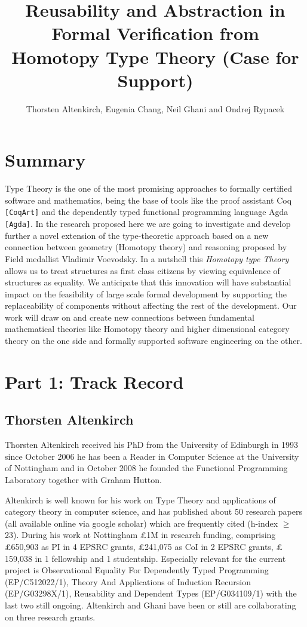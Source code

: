 \documentclass[twocolumn,a4paper,11pt]{article}
\title{Reusability and Abstraction in Formal Verification from Homotopy Type Theory
\LARGE (Case for Support)}
\author{Thorsten Altenkirch, Eugenia Chang, Neil Ghani and Ondrej Rypacek}
\date{}
\renewcommand{\cite}[1]{{\tt[#1]}}
\begin{document}
\raggedright
\sffamily

\maketitle
\section*{Summary}
Type Theory is the one of the most promising approaches to formally
certified software and mathematics, being the base of tools like the
proof assistant Coq \cite{CoqArt} and the dependently typed functional
programming language Agda \cite{Agda}. In the research proposed here
we are going to investigate and develop further a novel extension of
the type-theoretic approach based on a new connection between geometry
(Homotopy theory) and reasoning proposed by Field medallist Vladimir
Voevodsky. In a nutshell this \emph{Homotopy type Theory}
allows us to treat structures as first class citizens by viewing
equivalence of structures as equality. We anticipate that this
innovation will have substantial impact on the feasibility of large scale
formal development by supporting the replaceability of components
without affecting the rest of the development. Our work will draw on
and create new connections between fundamental mathematical theories
like Homotopy theory and higher dimensional category theory on the one
side and formally supported software engineering on the other.


\section*{Part 1: Track Record}

\subsection*{Thorsten Altenkirch}
Thorsten Altenkirch received his PhD from the University of
Edinburgh in 1993 since October 2006 he has been a Reader in
Computer Science at the University of Nottingham and in October
2008 he founded  the Functional Programming Laboratory together with
Graham Hutton.

Altenkirch is well known for his work on Type Theory and applications
of category theory in computer science, and has published about 50
research papers (all available online via google scholar) which are
frequently cited (h-index $\geq$ 23). During his work at Nottingham
\pounds 1M in research funding, comprising \pounds 650,903 as PI in 4
EPSRC grants, \pounds 241,075 as CoI in 2 EPSRC grants, \pounds
159,038 in 1 fellowship and 1 studentship. Especially relevant for the
current project is Observational Equality For Dependently Typed Programming
(EP/C512022/1), Theory And Applications of Induction Recursion (EP/G03298X/1),
Reusability and Dependent Types (EP/G034109/1) with the last two still
ongoing. Altenkirch and Ghani have been or still are collaborating on
three research grants.
\end{document}
